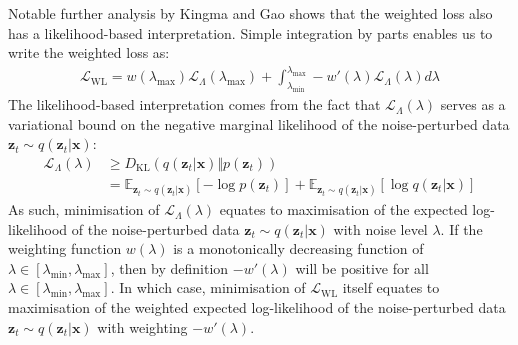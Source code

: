 \documentclass[ oneside,%
                    author={George Herbert},
                    degree={MSci},
                     title={Video Diffusion Models for Climate Simulations},
                  subtitle={}]{dissertation}
\begin{document}
Notable further analysis by Kingma and Gao \cite{Understanding_Diffusion_Objective_Kingma} shows that the weighted loss also has a likelihood-based interpretation. Simple integration by parts enables us to write the weighted loss as:
\begin{align}
      \mathcal{L}_{\mathrm{WL}} = w(\lambda_{\max})\mathcal{L}_\Lambda(\lambda_{\max}) + \int_{\lambda_{\min}}^{\lambda_{\max}}-w'(\lambda)\mathcal{L}_\Lambda(\lambda) d\lambda
\end{align}
The likelihood-based interpretation comes from the fact that $\mathcal{L}_\Lambda(\lambda)$ serves as a variational bound on the negative marginal likelihood of the noise-perturbed data $\mathbf{z}_t\sim q(\mathbf{z}_t|\mathbf{x})$:
\begin{align}
      \mathcal{L}_\Lambda(\lambda)&\ge D_{\mathrm{KL}}(q(\mathbf{z}_t|\mathbf{x})\Vert p(\mathbf{z}_t))\\
      &=\mathbb{E}_{\mathbf{z}_t\sim q(\mathbf{z}_t|\mathbf{x})}\left[-\log p(\mathbf{z}_t)\right]+\mathbb{E}_{\mathbf{z}_t\sim q(\mathbf{z}_t|\mathbf{x})}\left[\log q(\mathbf{z}_t|\mathbf{x})\right]
\end{align}
As such, minimisation of $\mathcal{L}_\Lambda(\lambda)$ equates to maximisation of the expected log-likelihood of the noise-perturbed data $\mathbf{z}_t\sim q(\mathbf{z}_t|\mathbf{x})$ with noise level $\lambda$. If the weighting function $w(\lambda)$ is a monotonically decreasing function of $\lambda\in [\lambda_{\min}, \lambda_{\max}]$, then by definition $-w'(\lambda)$ will be positive for all $\lambda\in [\lambda_{\min}, \lambda_{\max}]$. In which case, minimisation of $\mathcal{L}_{\mathrm{WL}}$ itself equates to maximisation of the weighted expected log-likelihood of the noise-perturbed data $\mathbf{z}_t\sim q(\mathbf{z}_t|\mathbf{x})$ with weighting $-w'(\lambda)$. 
\end{document}
